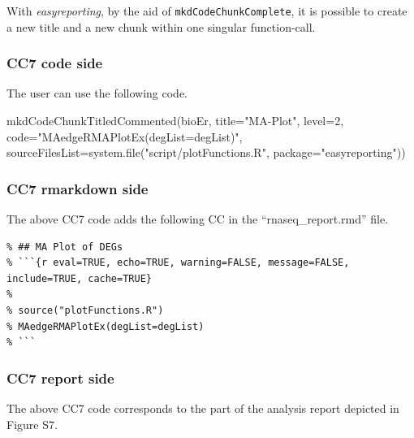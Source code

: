 \documentclass[
]{article}
\newenvironment{Shaded}{\begin{snugshade}}{\end{snugshade}}
\newcommand{\AttributeTok}[1]{\textcolor[rgb]{0.77,0.63,0.00}{#1}}
\newcommand{\DecValTok}[1]{\textcolor[rgb]{0.00,0.00,0.81}{#1}}
\newcommand{\FunctionTok}[1]{\textcolor[rgb]{0.00,0.00,0.00}{#1}}
\newcommand{\NormalTok}[1]{#1}
\newcommand{\StringTok}[1]{\textcolor[rgb]{0.31,0.60,0.02}{#1}}
\begin{document}
With \emph{easyreporting}, by the aid of \texttt{mkdCodeChunkComplete},
it is possible to create a new title and a new chunk within one singular
function-call.

\hypertarget{cc7-code-side}{%
\subsubsection{CC7 code side}\label{cc7-code-side}}

The user can use the following code.

\begin{Shaded}
\begin{Highlighting}[]
\FunctionTok{mkdCodeChunkTitledCommented}\NormalTok{(bioEr, }\AttributeTok{title=}\StringTok{"MA{-}Plot"}\NormalTok{, }\AttributeTok{level=}\DecValTok{2}\NormalTok{,}
                                    \AttributeTok{code=}\StringTok{"MAedgeRMAPlotEx(degList=degList)"}\NormalTok{,}
                                    \AttributeTok{sourceFilesList=}\FunctionTok{system.file}\NormalTok{(}\StringTok{"script/plotFunctions.R"}\NormalTok{,}
                                                        \AttributeTok{package=}\StringTok{"easyreporting"}\NormalTok{))}
\end{Highlighting}
\end{Shaded}

\hypertarget{cc7-rmarkdown-side}{%
\subsubsection{CC7 rmarkdown side}\label{cc7-rmarkdown-side}}

The above CC7 code adds the following CC in the ``rnaseq\_report.rmd''
file.

\begin{verbatim}
% ## MA Plot of DEGs
% ```{r eval=TRUE, echo=TRUE, warning=FALSE, message=FALSE, include=TRUE, cache=TRUE}
% 
% source("plotFunctions.R")
% MAedgeRMAPlotEx(degList=degList)
% ```
\end{verbatim}

\newpage

\hypertarget{cc7-report-side}{%
\subsubsection{CC7 report side}\label{cc7-report-side}}

The above CC7 code corresponds to the part of the analysis report
depicted in Figure S7.
\end{document}
